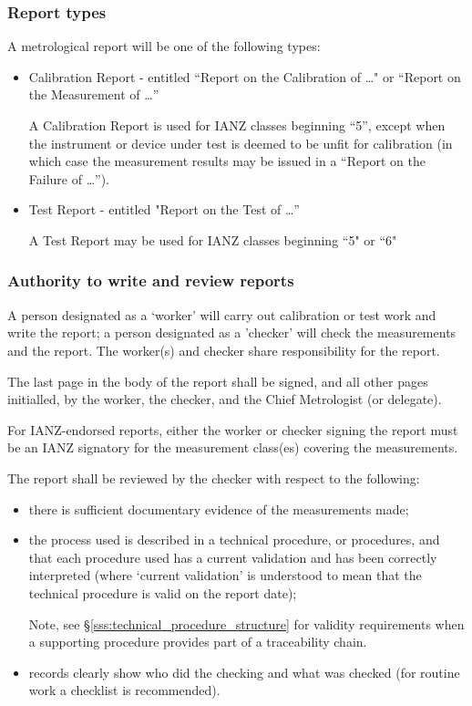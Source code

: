 \subsubsection{Report types}
A metrological report will be one of the following types:
\begin{itemize}
\item Calibration Report - entitled ``Report on the Calibration of \ldots" or ``Report on the Measurement of \ldots'' 

A Calibration Report is used for IANZ classes beginning ``5'', except when the instrument or device under test is deemed to be unfit for calibration (in which case the measurement results may be issued in a ``Report on the Failure of \ldots'').

\item Test Report - entitled "Report on the Test of \ldots''  

A Test Report may be used for IANZ classes beginning ``5" or ``6"
\end{itemize} 

\subsubsection{Authority to write and review reports}
A person designated as a `worker' will carry out calibration or test work and write the report; a person designated as a 'checker' will check the measurements and the report. The worker(s) and checker share responsibility for the report.

The last page in the body of the report shall be signed, and all other pages initialled, by the worker, the checker, and the Chief Metrologist (or delegate). 

For IANZ-endorsed reports, either the worker or checker signing the report must be an IANZ signatory for the measurement class(es) covering the measurements.

The report shall be reviewed by the checker with respect to the following: 
\begin{itemize}
\item there is sufficient documentary evidence of the measurements made;
\item the process used is described in a technical procedure, or procedures, and that each procedure used has a current validation and has been correctly interpreted (where `current validation' is understood to mean that the technical procedure is valid on the report date);

Note, see \S\ref{sss:technical_procedure_structure} for validity requirements when a supporting procedure provides part of a traceability chain.

\item records clearly show who did the checking and what was checked (for routine work a checklist is recommended).
\end{itemize} 


